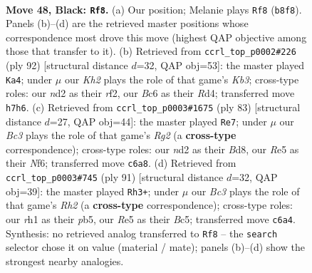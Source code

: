 \documentclass[11pt]{article}
\begin{document}
\clearpage

\begin{figure}[p]\centering
\begin{subfigure}{0.46\textwidth}\centering
\resizebox{\linewidth}{!}{%
\newchessgame
\chessboard[
  setfen={1r6/7k/1pb5/p1p1r3/8/2P2pP1/1K1N3P/6NR b - - 3 48},
  showmover=false,
  pgfstyle=straightmove, color=movearrow, markmove={b8-f8}
]}
\caption{}
\end{subfigure}\hfill
\begin{subfigure}{0.46\textwidth}\centering
\resizebox{\linewidth}{!}{%
\newchessgame
\chessboard[
  setfen={2B2k2/5p1p/1p4p1/6P1/1P1R1P1P/1K6/5rn1/8 w - - 8 47},
  showmover=false,
  pgfstyle=straightmove, color=movearrow, markmove={b3-a4}
]}
\caption{}
\end{subfigure}
\\[4pt]
\begin{subfigure}{0.46\textwidth}\centering
\resizebox{\linewidth}{!}{%
\newchessgame
\chessboard[
  setfen={1k1b4/1p4r1/p4np1/P1N1R3/8/2P5/1P6/1K1B4 b - - 4 42},
  showmover=false,
  pgfstyle=straightmove, color=movearrow, markmove={g7-e7}
]}
\caption{}
\end{subfigure}\hfill
\begin{subfigure}{0.46\textwidth}\centering
\resizebox{\linewidth}{!}{%
\newchessgame
\chessboard[
  setfen={2k5/p6r/2N2p2/1Pb1p1p1/2P3P1/2K5/8/5R2 b - - 3 46},
  showmover=false,
  pgfstyle=straightmove, color=movearrow, markmove={h7-h3}
]}
\caption{}
\end{subfigure}
\caption{\textbf{Move 48, Black: \texttt{Rf8}.} (a) Our position; Melanie plays \texttt{Rf8} (\texttt{b8f8}). Panels (b)--(d) are the retrieved master positions whose correspondence most drove this move (highest QAP objective among those that transfer to it). (b) Retrieved from \texttt{ccrl\_top\_p0002\#226} (ply 92) [structural distance $d$=32, QAP obj=53]: the master played \texttt{Ka4}; under $\mu$ our \emph{Kh2} plays the role of that game's \emph{Kb3}; cross-type roles: our \emph{n}d2 as their \emph{r}f2, our \emph{B}c6 as their \emph{R}d4; transferred move \texttt{h7h6}. (c) Retrieved from \texttt{ccrl\_top\_p0003\#1675} (ply 83) [structural distance $d$=27, QAP obj=44]: the master played \texttt{Re7}; under $\mu$ our \emph{Bc3} plays the role of that game's \emph{Rg2} (a \textbf{cross-type} correspondence); cross-type roles: our \emph{n}d2 as their \emph{B}d8, our \emph{R}e5 as their \emph{N}f6; transferred move \texttt{c6a8}. (d) Retrieved from \texttt{ccrl\_top\_p0003\#745} (ply 91) [structural distance $d$=32, QAP obj=39]: the master played \texttt{Rh3+}; under $\mu$ our \emph{Bc3} plays the role of that game's \emph{Rh2} (a \textbf{cross-type} correspondence); cross-type roles: our \emph{r}h1 as their \emph{p}b5, our \emph{R}e5 as their \emph{B}c5; transferred move \texttt{c6a4}. Synthesis: no retrieved analog transferred to \texttt{Rf8} -- the \texttt{search} selector chose it on value (material / mate); panels (b)--(d) show the strongest nearby analogies.}
\label{fig:thought-m95}
\end{figure}
\end{document}
